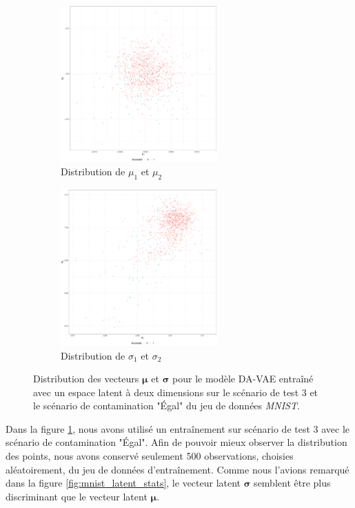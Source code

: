 \begin{figure}[H]
	\centering
	\begin{subfigure}{6cm}
		\centering\includegraphics[width=6cm, height=6cm]{images/latent_stats/mnist_mu_2d}
		\caption{Distribution de $\mu_1$ et $\mu_2$}
	\end{subfigure}
	\begin{subfigure}{6cm}
		\centering\includegraphics[width=6cm, height=6cm]{images/latent_stats/mnist_sigma_2d}
		\caption{Distribution de $\sigma_1$ et $\sigma_2$}
	\end{subfigure}
	\caption{Distribution des vecteurs $\boldsymbol{\mu}$ et $\boldsymbol{\sigma}$ pour le modèle DA-VAE entraîné avec un espace latent à deux dimensions sur le scénario de test 3 et le scénario de contamination "Égal" du jeu de données \textit{MNIST}.}
	\label{fig:mnist_latent_2d}
\end{figure}

Dans la figure \ref{fig:mnist_latent_2d}, nous avons utilisé un entraînement sur scénario de test 3 avec le scénario de contamination "Égal". Afin de pouvoir mieux observer la distribution des points, nous avons conservé seulement 500 observations, choisies aléatoirement, du jeu de données d'entraînement. Comme nous l'avions remarqué dans la figure \ref{fig:mnist_latent_stats}, le vecteur latent $\boldsymbol{\sigma}$ semblent être plus discriminant que le vecteur latent $\boldsymbol{\mu}$.

